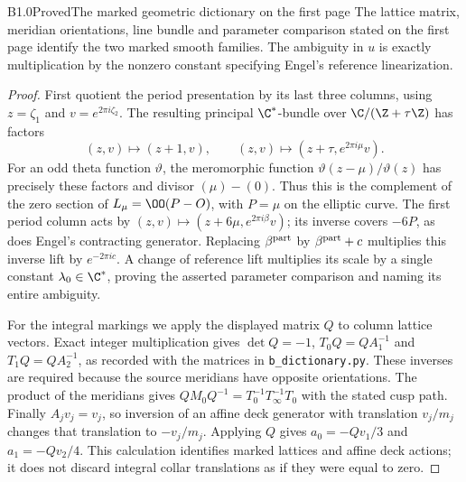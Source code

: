 \begin{claim}{B1.0}{Proved}{The marked geometric dictionary on the first page}
The lattice matrix, meridian orientations, line bundle and parameter
comparison stated on the first page identify the two marked smooth
families. The ambiguity in $u$ is exactly multiplication by the
nonzero constant specifying Engel's reference linearization.
\end{claim}
\begin{proof}
First quotient the period presentation by its last three columns,
using $z=\zeta_1$ and $v=e^{2\pi i\zeta_2}$. The resulting principal
$\C^*$-bundle over $\C/(\Z+\tau\Z)$ has factors
\[
 (z,v)\mapsto(z+1,v),\qquad
 (z,v)\mapsto(z+\tau,e^{2\pi i\mu}v).
\]
For an odd theta function $\vartheta$, the meromorphic function
$\vartheta(z-\mu)/\vartheta(z)$ has precisely these factors and
divisor $(\mu)-(0)$. Thus this is the complement of the zero section
of $L_\mu=\OO(P-O)$, with $P=\mu$ on the elliptic curve. The first
period column acts by
$(z,v)\mapsto(z+6\mu,e^{2\pi i\beta}v)$; its inverse covers $-6P$,
as does Engel's contracting generator. Replacing $\beta^{\rm part}$
by $\beta^{\rm part}+c$ multiplies this inverse lift by
$e^{-2\pi i c}$. A change of reference lift multiplies its scale by
a single constant $\lambda_0\in\C^*$, proving the asserted parameter
comparison and naming its entire ambiguity.

For the integral markings we apply the displayed matrix $Q$ to
column lattice vectors. Exact integer multiplication gives
$\det Q=-1$, $T_0Q=QA_1^{-1}$ and $T_1Q=QA_2^{-1}$, as recorded
with the matrices in \texttt{b\_dictionary.py}. These inverses are
required because the source meridians have opposite orientations.
The product of the meridians gives
$QM_0Q^{-1}=T_0^{-1}T_\infty^{-1}T_0$ with the stated cusp path.
Finally $A_jv_j=v_j$, so inversion of an affine deck generator with
translation $v_j/m_j$ changes that translation to $-v_j/m_j$.
Applying $Q$ gives $a_0=-Qv_1/3$ and $a_1=-Qv_2/4$.
This calculation identifies marked lattices and affine deck actions;
it does not discard integral collar translations as if they were
equal to zero.
\end{proof}
